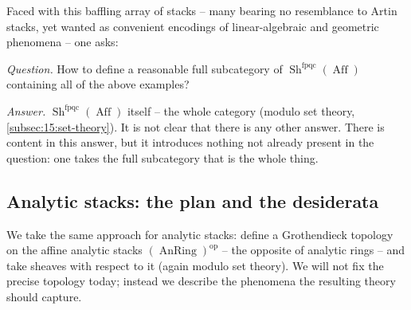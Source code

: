 Faced with this baffling array of stacks -- many bearing no resemblance to Artin
stacks, yet wanted as convenient encodings of linear-algebraic and geometric
phenomena -- one asks:

\begin{remark}
\label{rmk:15:answer}
\emph{Question.} How to define a reasonable full subcategory of
$\operatorname{Sh}^{\mathrm{fpqc}}(\operatorname{Aff})$ containing all of the above
examples?

\emph{Answer.} $\operatorname{Sh}^{\mathrm{fpqc}}(\operatorname{Aff})$ itself -- the
whole category (modulo set theory, \cref{subsec:15:set-theory}). It is not clear that
there is any other answer. There is content in this answer, but it introduces
nothing not already present in the question: one takes the full subcategory that is
the whole thing.
\end{remark}

\subsection{Analytic stacks: the plan and the desiderata}

\begin{remark}
\label{rmk:15:plan}
We take the same approach for analytic stacks: define a Grothendieck topology on the
affine analytic stacks $(\operatorname{AnRing})^{\mathrm{op}}$ -- the opposite of
analytic rings -- and take sheaves with respect to it (again modulo set theory). We
will not fix the precise topology today; instead we describe the phenomena the
resulting theory should capture.
\end{remark}

